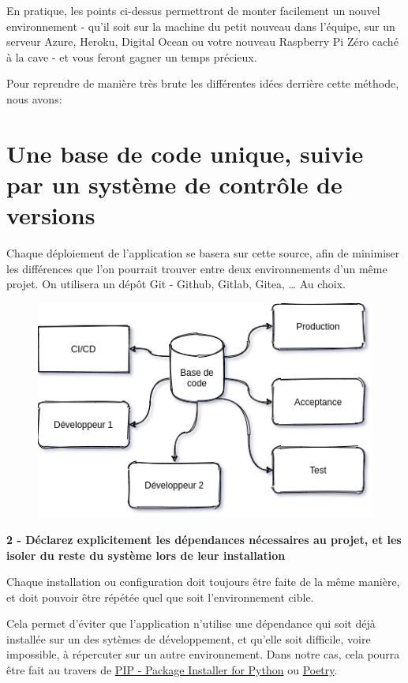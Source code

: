 \documentclass[11pt]{amsbook}
\begin{document}
En pratique, les points ci-dessus permettront de monter facilement un nouvel environnement - qu’il soit sur la machine du petit nouveau dans l’équipe, sur un serveur Azure, Heroku, Digital Ocean ou votre nouveau Raspberry Pi Zéro caché à la cave - et vous feront gagner un temps précieux.


Pour reprendre de manière très brute les différentes idées derrière cette méthode, nous avons:


\section{Une base de code unique, suivie par un système de contrôle de versions}


Chaque déploiement de l’application se basera sur cette source, afin de minimiser les différences que l’on pourrait trouver entre deux environnements d’un même projet. On utilisera un dépôt Git - Github, Gitlab, Gitea, …​ Au choix.


\begin{figure}[h]{}
\centering\includegraphics[width=2.5truein]{images/diagrams/12-factors-1.png}

\centering
\end{figure}

\textbf{2 - Déclarez explicitement les dépendances nécessaires au projet, et les isoler du reste du système lors de leur installation}


Chaque installation ou configuration doit toujours être faite de la même manière, et doit pouvoir être répétée quel que soit l’environnement cible.


Cela permet d’éviter que l’application n’utilise une dépendance qui soit déjà installée sur un des sytèmes de développement, et qu’elle soit difficile, voire impossible, à répercuter sur un autre environnement.
Dans notre cas, cela pourra être fait au travers de \href{https://pypi.org/project/pip/}{PIP - Package Installer for Python} ou \href{https://python-poetry.org/}{Poetry}.
\end{document}
